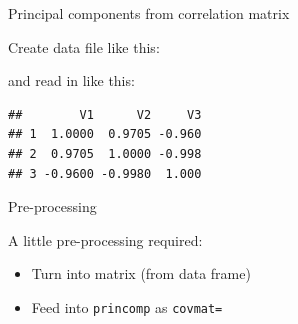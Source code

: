 \begin{frame}[fragile]{Principal components from correlation matrix}
  
  Create data file like this:

  
  
  
  and read in like this:
  
\begin{knitrout}
\color{fgcolor}\begin{kframe}
\begin{alltt}
\hlkwb{=}\hlstd{(}\hlstd{,}
\end{alltt}
\begin{verbatim}
##        V1      V2     V3
## 1  1.0000  0.9705 -0.960
## 2  0.9705  1.0000 -0.998
## 3 -0.9600 -0.9980  1.000
\end{verbatim}
\end{kframe}
\end{knitrout}
  
\end{frame}

\begin{frame}[fragile]{Pre-processing}
  
  A little pre-processing required:
  
  \begin{itemize}
  \item Turn into matrix (from data frame)
  \item Feed into \texttt{princomp} as \texttt{covmat=}
  \end{itemize}
  
\begin{knitrout}
\color{fgcolor}\begin{kframe}
\begin{alltt}
\hlkwb{=}
\hlkwb{=}\hlstd{(}
\end{alltt}
\end{kframe}
\end{knitrout}
  
\end{frame}

